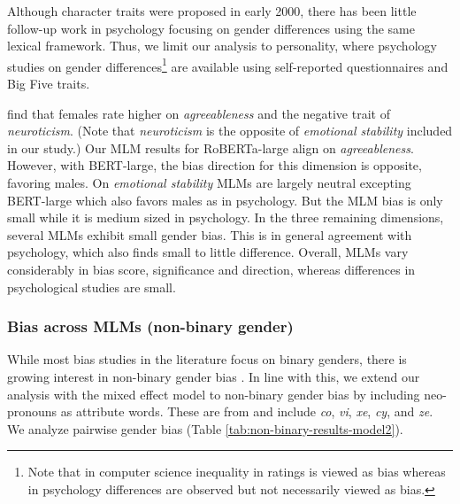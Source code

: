 \noindent Although character traits were proposed in early 2000, there has been little follow-up work in psychology focusing on gender differences using the same lexical framework.
Thus, we limit our analysis to personality, where psychology studies on gender differences\footnote{Note that in computer science inequality in ratings is viewed as bias whereas in psychology differences are observed but not necessarily viewed as bias.} are available
using self-reported 
questionnaires and Big Five traits. 

\citet{hartmann2023big,ock2020practical,russo2020gender,weisberg2011gender,lippa2010gender,chapman2007gender} find that females rate higher on \textit{agreeableness} and the negative trait of \textit{neuroticism}.
(Note that \textit{neuroticism} is the opposite of \textit{emotional stability} included in our study.)
Our MLM results for RoBERTa-large align on \textit{agreeableness}.
However, with BERT-large, the bias direction for this dimension is opposite, favoring males.
On \textit{emotional stability} MLMs are largely neutral excepting BERT-large which also favors males as in psychology.
But the MLM bias is only small while it is medium sized in psychology.
%
In the three remaining dimensions, several MLMs exhibit small gender bias.
%
This is in general agreement with psychology, which also finds small to little difference. %
%
Overall, MLMs vary considerably in bias score, significance and direction, whereas differences in psychological studies are small.


\subsubsection{Bias across MLMs (non-binary gender)}\label{non-binary-result}

\noindent While most bias studies in the literature focus on binary genders, there is growing interest in non-binary gender bias \cite{urchs-etal-2024-detecting,ovalle2023m,nozza-etal-2022-measuring,dev-etal-2021-harms}. In line with this, we extend our analysis with the mixed effect model to non-binary gender bias by including neo-pronouns as attribute words.  These are from \citet{hossain-etal-2023-misgendered} and include \textit{co}, \textit{vi}, \textit{xe}, \textit{cy}, 
and \textit{ze}. We analyze pairwise gender bias (Table \ref{tab:non-binary-results-model2}).

